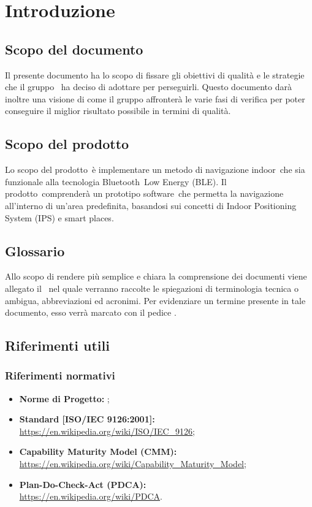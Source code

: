 \documentclass[../PianoDiQualifica.tex]{subfiles}
\begin{document}
\section{Introduzione}
	\subsection{Scopo del documento}
	Il presente documento ha lo scopo di fissare gli obiettivi di qualità e le strategie che il gruppo \leaf\ ha deciso di adottare per perseguirli. Questo documento darà inoltre una visione di come il gruppo affronterà le varie fasi di verifica per poter conseguire il miglior risultato possibile in termini di qualità.
	\subsection{Scopo del prodotto}
	Lo scopo del prodotto\g\ è implementare un metodo di navigazione indoor\g\ che sia funzionale alla tecnologia Bluetooth\g\ Low Energy (BLE\g). Il prodotto\g\ 
comprenderà un prototipo software\g\ che permetta la navigazione all’interno di un’area predefinita, basandosi sui concetti di Indoor Positioning System (IPS\g) e smart places\g.

	\subsection{Glossario}
	Allo scopo di rendere più semplice e chiara la comprensione dei documenti viene allegato il \glossariov\ nel quale verranno raccolte le spiegazioni di  terminologia tecnica o ambigua,
abbreviazioni ed acronimi. Per evidenziare un termine presente in tale documento, esso verrà marcato con il pedice \g.
	\subsection{Riferimenti utili}
		\subsubsection{Riferimenti normativi}
		\begin{itemize}
			\item \textbf{Norme di Progetto:} \normediprogettov;
			\item \textbf{Standard [ISO/IEC 9126:2001]:} \\\url{https://en.wikipedia.org/wiki/ISO/IEC\_9126};
			\item \textbf{Capability Maturity Model (CMM\g):} \\\url{https://en.wikipedia.org/wiki/Capability\_Maturity\_Model};
			\item \textbf{Plan-Do-Check-Act (PDCA\g):} \\\url{https://en.wikipedia.org/wiki/PDCA}.
		\end{itemize}
\end{document}
